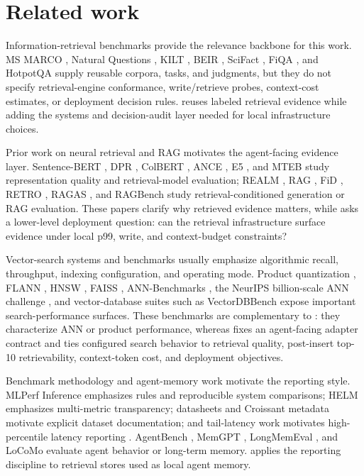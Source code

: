\section{Related work}

Information-retrieval benchmarks provide the relevance backbone for this work. MS MARCO \citep{bajaj2016msmarco}, Natural Questions \citep{kwiatkowski2019natural}, KILT \citep{petroni2021kilt}, BEIR \citep{thakur2021beir}, SciFact \citep{wadden2020scifact}, FiQA \citep{maia2018fiqa}, and HotpotQA \citep{yang2018hotpotqa} supply reusable corpora, tasks, and judgments, but they do not specify retrieval-engine conformance, write/retrieve probes, context-cost estimates, or deployment decision rules. \sys reuses labeled retrieval evidence while adding the systems and decision-audit layer needed for local infrastructure choices.

Prior work on neural retrieval and RAG motivates the agent-facing evidence layer. Sentence-BERT \citep{reimers2019sentence}, DPR \citep{karpukhin2020dense}, ColBERT \citep{khattab2020colbert}, ANCE \citep{xiong2021approximate}, E5 \citep{wang2022text}, and MTEB \citep{muennighoff2023mteb} study representation quality and retrieval-model evaluation; REALM \citep{guu2020retrieval}, RAG \citep{lewis2020retrieval}, FiD \citep{izacard2021leveraging}, RETRO \citep{borgeaud2022improving}, RAGAS \citep{es2024ragas}, and RAGBench \citep{friel2024ragbench} study retrieval-conditioned generation or RAG evaluation. These papers clarify why retrieved evidence matters, while \sys asks a lower-level deployment question: can the retrieval infrastructure surface evidence under local p99, write, and context-budget constraints?

Vector-search systems and benchmarks usually emphasize algorithmic recall, throughput, indexing configuration, and operating mode. Product quantization \citep{jegou2011product}, FLANN \citep{muja2014scalable}, HNSW \citep{malkov2020efficient}, FAISS \citep{johnson2019faiss}, ANN-Benchmarks \citep{aumuller2020ann}, the NeurIPS billion-scale ANN challenge \citep{simhadri2021bigann}, and vector-database suites such as VectorDBBench \citep{vectordbbench} expose important search-performance surfaces. These benchmarks are complementary to \sys: they characterize ANN or product performance, whereas \sys fixes an agent-facing adapter contract and ties configured search behavior to retrieval quality, post-insert top-10 retrievability, context-token cost, and deployment objectives.

Benchmark methodology and agent-memory work motivate the reporting style. MLPerf Inference \citep{reddi2019mlperf} emphasizes rules and reproducible system comparisons; HELM \citep{liang2023helm} emphasizes multi-metric transparency; datasheets \citep{gebru2021datasheets} and Croissant metadata \citep{mlcommons2024croissant} motivate explicit dataset documentation; and tail-latency work motivates high-percentile latency reporting \citep{dean2013tail}. AgentBench \citep{liu2023agentbench}, MemGPT \citep{packer2023memgpt}, LongMemEval \citep{wu2024longmemeval}, and LoCoMo \citep{maharana2024locomo} evaluate agent behavior or long-term memory. \sys applies the reporting discipline to retrieval stores used as local agent memory.
